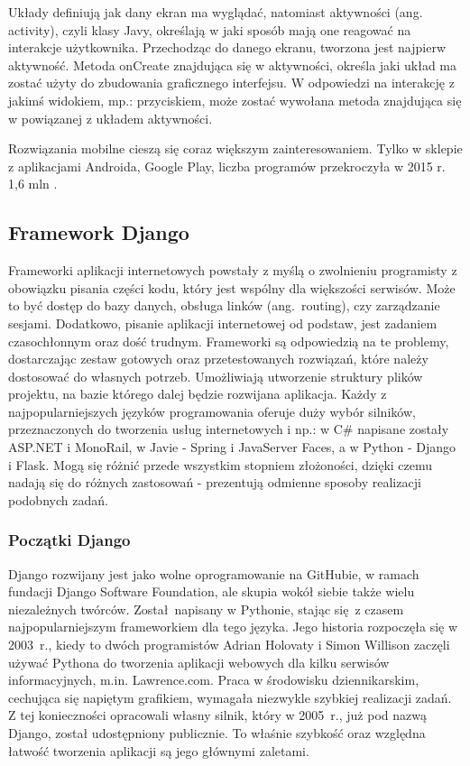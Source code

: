 Układy definiują jak dany ekran ma wyglądać, natomiast aktywności (ang. activity), czyli klasy Javy, określają w jaki sposób mają one reagować na interakcje użytkownika. Przechodząc do danego ekranu, tworzona jest najpierw aktywność. Metoda onCreate znajdująca się w aktywności, określa jaki układ ma zostać użyty do zbudowania graficznego interfejsu. W odpowiedzi na interakcję z jakimś widokiem, mp.: przyciskiem, może zostać wywołana metoda znajdująca się w powiązanej z układem aktywności.

Rozwiązania mobilne cieszą się coraz większym zainteresowaniem. Tylko w sklepie z aplikacjami Androida, Google Play, liczba programów przekroczyła w 2015 r. 1,6 mln \cite{biblia_ebiznesu_2}.

\subsection{Framework Django}
Frameworki aplikacji internetowych powstały z myślą o zwolnieniu programisty z obowiązku pisania części kodu, który jest wspólny dla większości serwisów. Może to być dostęp do bazy danych, obsługa linków (ang.~routing), czy zarządzanie sesjami. Dodatkowo, pisanie aplikacji internetowej od podstaw, jest zadaniem czasochłonnym oraz dość trudnym. Frameworki są odpowiedzią na te problemy, dostarczając zestaw gotowych oraz przetestowanych rozwiązań, które należy dostosować do własnych potrzeb. Umożliwiają utworzenie struktury plików projektu, na bazie którego dalej będzie rozwijana aplikacja. Każdy z najpopularniejszych języków programowania oferuje duży wybór silników, przeznaczonych do tworzenia usług internetowych i np.: w C\# napisane zostały ASP.NET i MonoRail, w Javie - Spring i JavaServer Faces, a w Python - Django i Flask. Mogą się różnić przede wszystkim stopniem złożoności, dzięki czemu nadają się do różnych zastosowań - prezentują odmienne sposoby realizacji podobnych zadań.

\subsubsection*{Początki Django}
Django rozwijany jest jako wolne oprogramowanie na GitHubie, w ramach fundacji Django Software Foundation, ale skupia wokół siebie także wielu niezależnych twórców. Został napisany w Pythonie, stając się z czasem najpopularniejszym frameworkiem dla tego języka. Jego historia rozpoczęła się w 2003~r., kiedy to dwóch programistów Adrian Holovaty i Simon Willison zaczęli używać Pythona do tworzenia aplikacji webowych dla kilku serwisów informacyjnych, m.in. Lawrence.com. Praca w środowisku dziennikarskim, cechująca się napiętym grafikiem, wymagała niezwykle szybkiej realizacji zadań. Z tej konieczności opracowali własny silnik, który w 2005~r., już pod nazwą Django, został udostępniony publicznie. To właśnie szybkość oraz względna łatwość tworzenia aplikacji są jego głównymi zaletami.

